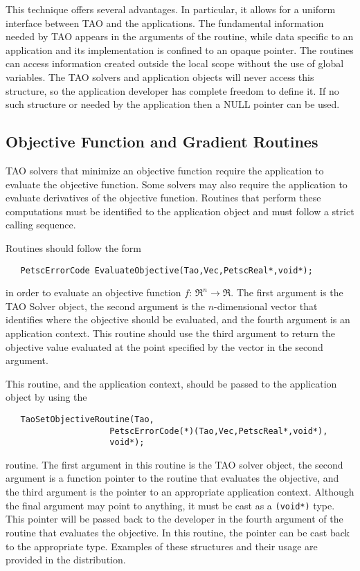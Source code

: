 This technique offers several advantages.
In particular, it allows for a uniform interface between TAO and 
the applications.   The fundamental information needed by TAO 
appears in the arguments of the routine, while data specific to an application
and its implementation is confined to an opaque pointer.
The routines can access information created outside the 
local scope without the use of global variables.
The TAO solvers and application objects will never access this structure, 
so the application developer has complete freedom to define it. If no 
such structure or needed by the application then a NULL pointer can be used.



\subsection{Objective Function and Gradient Routines}\label{sec:fghj}

TAO solvers that minimize an objective function require
the application to evaluate the objective function.  Some solvers
may also require the application to evaluate
derivatives of the objective function.  
Routines that perform these computations must be identified
to the application object and must follow a strict calling sequence.

Routines should follow the form
\begin{verbatim}
   PetscErrorCode EvaluateObjective(Tao,Vec,PetscReal*,void*);
\end{verbatim}
in order to evaluate an objective function $f: \, \Re^n \to \Re$. 
The first argument is the TAO Solver object, the second argument is the
$n$-dimensional vector that identifies where the objective should be evaluated, 
and the fourth argument is an application context.
This routine should use the third argument to return the objective value 
evaluated at the point
specified by the vector in the second argument.

This routine, and the application context, should be passed to the 
application object by using
the  
\begin{verbatim}
   TaoSetObjectiveRoutine(Tao,
                     PetscErrorCode(*)(Tao,Vec,PetscReal*,void*),
                     void*);
\end{verbatim}
routine. 
The first argument in this routine is the TAO solver object, 
the second argument is a function pointer to the routine that 
evaluates the objective, and the third
argument is the pointer to an appropriate application context.  
Although the final argument may point to anything, it must be cast as a {\tt (void*)} type.
This pointer will be passed back to the developer in the fourth argument of the
routine that evaluates the objective.  In this routine, the pointer can be cast
back to the appropriate type.  Examples of these structures and their 
usage are provided in the distribution.

